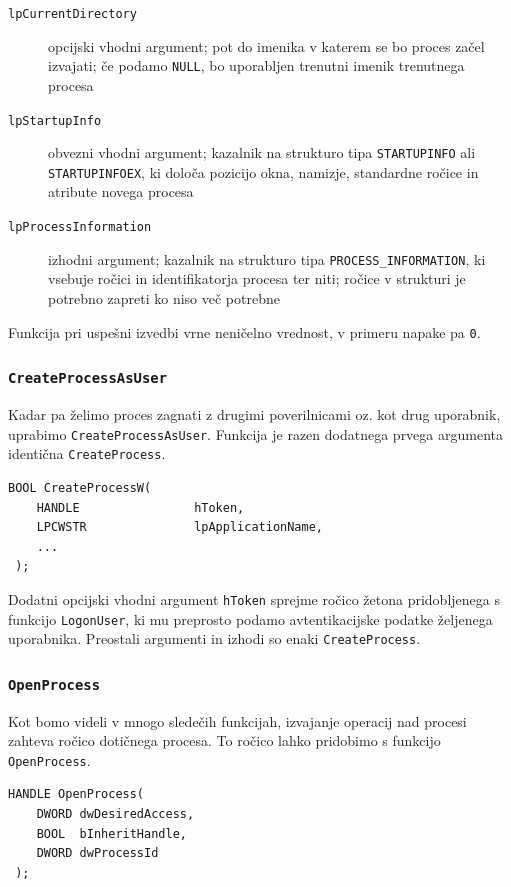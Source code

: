 \documentclass[a4paper,12pt,openright]{book}
\begin{document}
\begin{description}
	\item[\texttt{lpCurrentDirectory}] opcijski vhodni argument; pot do imenika v katerem se bo proces začel izvajati; če podamo \texttt{NULL}, bo uporabljen trenutni imenik trenutnega procesa
	\item[\texttt{lpStartupInfo}] obvezni vhodni argument; kazalnik na strukturo tipa \texttt{STARTUPINFO} ali \texttt{STARTUPINFOEX}, ki določa pozicijo okna, namizje, standardne ročice in atribute novega procesa
	\item[\texttt{lpProcessInformation}] izhodni argument; kazalnik na strukturo tipa \texttt{PROCESS\_INFORMATION}, ki vsebuje ročici in identifikatorja procesa ter niti; ročice v strukturi je potrebno zapreti ko niso več potrebne
\end{description}

Funkcija pri uspešni izvedbi vrne neničelno vrednost, v primeru napake pa \texttt{0}.

\subsubsection{\texttt{CreateProcessAsUser}}

Kadar pa želimo proces zagnati z drugimi poverilnicami oz. kot drug uporabnik, uprabimo \texttt{CreateProcessAsUser}.
Funkcija je razen dodatnega prvega argumenta identična \texttt{CreateProcess}.

\begin{lstlisting}[style=func]
 BOOL CreateProcessW(
	HANDLE                hToken,   
	LPCWSTR               lpApplicationName,
	...
 );
\end{lstlisting}

Dodatni opcijski vhodni argument \texttt{hToken} sprejme ročico žetona pridobljenega s funkcijo \texttt{LogonUser}, ki mu preprosto podamo avtentikacijske podatke željenega uporabnika.
Preostali argumenti in izhodi so enaki \texttt{CreateProcess}.

\subsubsection{\texttt{OpenProcess}}

Kot bomo videli v mnogo sledečih funkcijah, izvajanje operacij nad procesi zahteva ročico dotičnega procesa.
To ročico lahko pridobimo s funkcijo \texttt{OpenProcess}.

\begin{lstlisting}[style=func]
 HANDLE OpenProcess(
	DWORD dwDesiredAccess,
	BOOL  bInheritHandle,
	DWORD dwProcessId
 );
\end{lstlisting}
\end{document}
